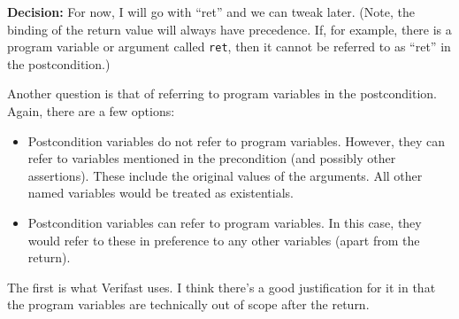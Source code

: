 \documentclass[a4paper]{article}
\begin{document}
\textbf{Decision:}
For now, I will go with ``ret'' and we can tweak later.
(Note, the binding of the return value will always have precedence.
If, for example, there is a program variable or argument called \texttt{ret}, then it cannot be referred to as ``ret'' in the postcondition.)

Another question is that of referring to program variables in the postcondition.
Again, there are a few options:
\begin{itemize}
  \item Postcondition variables do not refer to program variables.
    However, they can refer to variables mentioned in the precondition (and possibly other assertions).
    These include the original values of the arguments.
    All other named variables would be treated as existentials.
  \item Postcondition variables can refer to program variables.
    In this case, they would refer to these in preference to any other variables (apart from the return).
\end{itemize}

The first is what Verifast uses.
I think there's a good justification for it in that the program variables are technically out of scope after the return.
\end{document}
